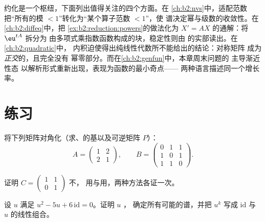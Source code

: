 \begin{remark}[本卷中的几个视角]\label{rem:b2:reduction:perspectives}
约化是一个枢纽，下面列出值得关注的四个方面。在
\cref{ch:b2:nvs}中，适配范数把“所有的模
$< 1$”转化为“某个算子范数 $< 1$”，使
谱决定幂与级数的收敛性。在
\cref{ch:b2:diffeq}中，把
\cref{ex:b2:reduction:powers}的做法化为
$X' = AX$ 的通解：将 $\eu^{tA}$ 拆分为
由多项式乘指数函数构成的块，稳定性则由
的实部读出。在\cref{ch:b2:quadratic}中，
内积迫使得出纯线性代数所不能给出的结论：对称矩阵
成为\emph{正交}的，且完全没有
幂零部分。而在\cref{ch:b2:genfun}中，本章周末问题的
主导渐近性态
以解析形式重新出现，表现为函数的最小奇点——
两种语言描述同一个增长率。
\end{remark}

\section{练习}

\begin{exercise}[$\star$]\label{exo:b2:reduction:1}
将下列矩阵对角化（求、的基以及可逆矩阵 $P$）：
\[
A = \begin{pmatrix} 1 & 2\\ 2 & 1 \end{pmatrix},
\qquad
B = \begin{pmatrix} 0 & 1 & 1\\ 1 & 0 & 1\\ 1 & 1 & 0
\end{pmatrix}.
\]
\end{exercise}

\begin{exercise}[$\star$]\label{exo:b2:reduction:2}
证明 $C = \begin{pmatrix} 1 & 1\\ 0 & 1\end{pmatrix}$ 不，
用与用，两种方法各证一次。
\end{exercise}

\begin{exercise}[$\star$]\label{exo:b2:reduction:3}
设 $u$ 满足 $u^2 - 5u + 6\,\mathrm{id} = 0$。证明 $u$ ，
确定所有可能的谱，并把 $u^k$
写成 $\mathrm{id}$ 与 $u$ 的线性组合。
\end{exercise}

